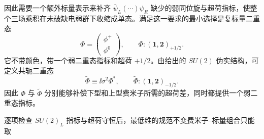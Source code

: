因此需要一个额外标量表示来补齐 $\bar\psi_L(\cdots)\psi_R$ 缺少的弱同位旋与超荷指标，使整个三场乘积在未破缺电弱群下收缩成单态。满足这一要求的最小选择是复标量二重态
\begin{equation}
 {
 \Phi=\begin{pmatrix}\phi^+\\ \phi^0\end{pmatrix},
 \qquad
 \Phi:(\mathbf1,\mathbf2)_{+1/2}.}
 \label{eq:sm-higgs-rep-dp11}
\end{equation}
它不带颜色，带一个弱二重态指标和超荷 $+1/2$。由给出的 $SU(2)$ 伪实结构，可定义共轭二重态
\begin{equation*}
 \widetilde\Phi\equiv\ii\sigma^2\Phi^*,
 \qquad
 \widetilde\Phi:(\mathbf1,\mathbf2)_{-1/2}.
\end{equation*}
因此 $\Phi$ 与 $\widetilde\Phi$ 分别能够补偿下型和上型费米子所需的超荷差，同时都提供一个弱二重态指标。

逐项检查 $SU(2)_L$ 指标与超荷守恒后，最低维的规范不变费米子--标量组合只能取


